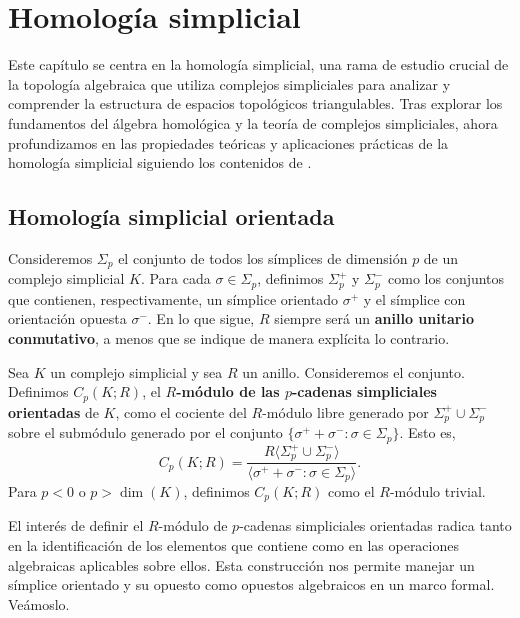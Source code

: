 
\chapter{Homología simplicial}

Este capítulo se centra en la homología simplicial, una rama de estudio crucial
de la topología algebraica que utiliza complejos simpliciales para analizar y
comprender la estructura de espacios topológicos triangulables. Tras explorar los
fundamentos del álgebra homológica y la teoría de complejos simpliciales, ahora
profundizamos en las propiedades teóricas y aplicaciones prácticas de la
homología simplicial siguiendo los contenidos de \cite{rafael2003elementos}.

\section{Homología simplicial orientada}
Consideremos \(\Sigma_{p}\) el conjunto de todos los símplices de dimensión \(p\) de
un complejo simplicial \(K\). Para cada \(\sigma \in \Sigma_{p}\), definimos
\(\Sigma_{p}^{+}\) y \(\Sigma_{p}^{-}\) como los conjuntos que contienen, respectivamente,
un símplice orientado \(\sigma^{+}\) y el símplice con orientación opuesta
\(\sigma^{-}\). En lo que sigue, \(R\) siempre será un \textbf{anillo unitario conmutativo}, a menos que se indique de manera explícita lo contrario.

\begin{definicion}
	Sea \(K\) un complejo simplicial y sea \(R\) un anillo. Consideremos el conjunto. Definimos
	\(C_{p}(K;R)\), el \textbf{\(R\)-módulo de las \(p\)-cadenas simpliciales orientadas}
	de \(K\), como el cociente del \(R\)-módulo libre generado por
	\(\Sigma_{p}^{+}\cup \Sigma_{p}^{-}\) sobre el submódulo generado por el
	conjunto \(\{\sigma^{+}+ \sigma^{-}: \sigma \in \Sigma_{p}\}\). Esto es,
	\[
	C_{p}(K;R) = \frac{R\langle \Sigma_{p}^{+}\cup \Sigma_{p}^{-}\rangle}{\langle
		\sigma^{+}+ \sigma^{-}: \sigma \in \Sigma_{p}\rangle}.
	\]
	Para \(p < 0\) o \(p > \dim(K)\), definimos \(C_{p}(K;R)\) como el \(R\)-módulo trivial.
\end{definicion}
El interés de definir el \(R\)-módulo de \(p\)-cadenas simpliciales orientadas radica
tanto en la identificación de los elementos que contiene como en las operaciones
algebraicas aplicables sobre ellos. Esta construcción nos permite manejar un
símplice orientado y su opuesto como opuestos algebraicos en un marco formal. Veámoslo.

